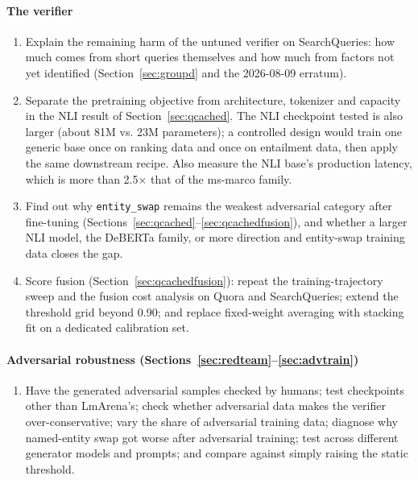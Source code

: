 \documentclass[11pt]{article}
\begin{document}
\paragraph{The verifier}
\begin{enumerate}[leftmargin=*,resume]
  \item Explain the remaining harm of the untuned verifier on SearchQueries: how much comes from short queries themselves and how much from factors not yet identified (Section~\ref{sec:groupd} and the 2026-08-09 erratum).
  \item Separate the pretraining objective from architecture, tokenizer and capacity in the NLI result of Section~\ref{sec:qcached}. The NLI checkpoint tested is also larger (about 81M vs. 23M parameters); a controlled design would train one generic base once on ranking data and once on entailment data, then apply the same downstream recipe. Also measure the NLI base's production latency, which is more than 2.5$\times$ that of the ms-marco family.
  \item Find out why \texttt{entity\_\allowbreak{}swap} remains the weakest adversarial category after fine-tuning (Sections~\ref{sec:qcached}--\ref{sec:qcachedfusion}), and whether a larger NLI model, the DeBERTa family, or more direction and entity-swap training data closes the gap.
  \item Score fusion (Section~\ref{sec:qcachedfusion}): repeat the training-trajectory sweep and the fusion cost analysis on Quora and SearchQueries; extend the threshold grid beyond 0.90; and replace fixed-weight averaging with stacking fit on a dedicated calibration set.
\end{enumerate}

\paragraph{Adversarial robustness (Sections~\ref{sec:redteam}--\ref{sec:advtrain})}
\begin{enumerate}[leftmargin=*,resume]
  \item Have the generated adversarial samples checked by humans; test checkpoints other than LmArena's; check whether adversarial data makes the verifier over-conservative; vary the share of adversarial training data; diagnose why named-entity swap got worse after adversarial training; test across different generator models and prompts; and compare against simply raising the static threshold.
\end{enumerate}
\end{document}
